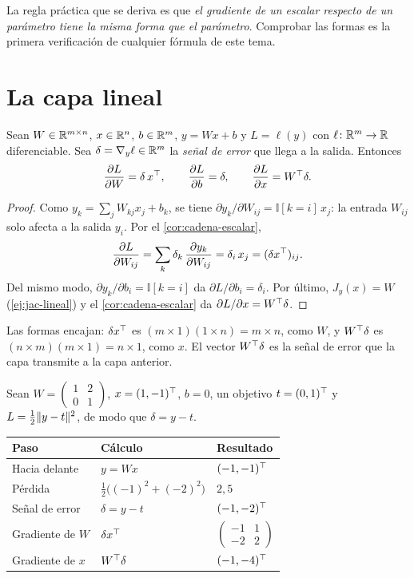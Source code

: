 La regla práctica que se deriva es que \emph{el gradiente de un escalar respecto de un parámetro tiene la misma forma que el parámetro}. Comprobar las formas es la primera verificación de cualquier fórmula de este tema.

\section{La capa lineal}

\begin{proposicion}\label{prop:capa}
Sean $W\in\mathbb{R}^{m\times n}$, $x\in\mathbb{R}^{n}$, $b\in\mathbb{R}^{m}$, $y=Wx+b$ y $L=\ell(y)$ con $\ell\colon\mathbb{R}^{m}\to\mathbb{R}$ diferenciable. Sea $\delta=\nabla_y\ell\in\mathbb{R}^{m}$ la \emph{señal de error} que llega a la salida. Entonces
\[
\frac{\partial L}{\partial W}=\delta\,x^{\top},\qquad
\frac{\partial L}{\partial b}=\delta,\qquad
\frac{\partial L}{\partial x}=W^{\top}\delta.
\]
\end{proposicion}

\begin{proof}
Como $y_k=\sum_{j}W_{kj}x_j+b_k$, se tiene $\partial y_k/\partial W_{ij}=\mathbb{I}[k=i]\,x_j$: la entrada $W_{ij}$ solo afecta a la salida $y_i$. Por el \cref{cor:cadena-escalar},
\[
\frac{\partial L}{\partial W_{ij}}=\sum_{k}\delta_k\,\frac{\partial y_k}{\partial W_{ij}}=\delta_i\,x_j=(\delta x^{\top})_{ij}.
\]
Del mismo modo, $\partial y_k/\partial b_i=\mathbb{I}[k=i]$ da $\partial L/\partial b_i=\delta_i$. Por último, $J_y(x)=W$ (\cref{ej:jac-lineal}) y el \cref{cor:cadena-escalar} da $\partial L/\partial x=W^{\top}\delta$.
\end{proof}

Las formas encajan: $\delta x^{\top}$ es $(m\times 1)(1\times n)=m\times n$, como $W$, y $W^{\top}\delta$ es $(n\times m)(m\times 1)=n\times 1$, como $x$. El vector $W^{\top}\delta$ es la señal de error que la capa transmite a la capa anterior.

\begin{ejemplo}\label{ej:capa}
Sean $W=\begin{pmatrix}1&2\\0&1\end{pmatrix}$, $x=(1,-1)^{\top}$, $b=0$, un objetivo $t=(0,1)^{\top}$ y $L=\tfrac12\lVert y-t\rVert^{2}$, de modo que $\delta=y-t$.
\begin{center}\small
\begin{tabular}{@{}lll@{}}
\toprule
Paso & Cálculo & Resultado \\
\midrule
Hacia delante & $y=Wx$ & $(-1,-1)^{\top}$ \\
Pérdida & $\tfrac12\bigl((-1)^{2}+(-2)^{2}\bigr)$ & $2{,}5$ \\
Señal de error & $\delta=y-t$ & $(-1,-2)^{\top}$ \\
Gradiente de $W$ & $\delta x^{\top}$ & $\begin{pmatrix}-1&1\\-2&2\end{pmatrix}$ \\[2mm]
Gradiente de $x$ & $W^{\top}\delta$ & $(-1,-4)^{\top}$ \\
\bottomrule
\end{tabular}
\end{center}
\end{ejemplo}


